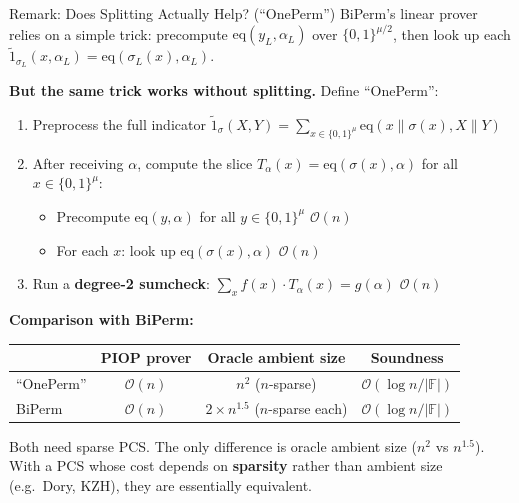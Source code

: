 \documentclass[aspectratio=169,10pt]{beamer}
\newcommand{\F}{\mathbb{F}}
\newcommand{\B}{\{0,1\}}
\newcommand{\eq}{\mathrm{eq}}
\newcommand{\wt}[1]{\widetilde{#1}}
\newcommand{\bigO}{\mathcal{O}}
\begin{document}
\begin{frame}{Remark: Does Splitting Actually Help? (``OnePerm'')}
BiPerm's linear prover relies on a simple trick: precompute $\eq(y_L, \alpha_L)$ over $\B^{\mu/2}$, then look up each $\wt{1}_{\sigma_L}(x, \alpha_L) = \eq(\sigma_L(x), \alpha_L)$.

\vspace{0.4em}
\textbf{But the same trick works without splitting.} Define ``OnePerm'':
\begin{enumerate}
  \item Preprocess the full indicator $\wt{1}_\sigma(X,Y) = \sum_{x \in \B^\mu} \eq(x \| \sigma(x), X \| Y)$
  \item After receiving $\alpha$, compute the slice $T_\alpha(x) = \eq(\sigma(x), \alpha)$ for all $x \in \B^\mu$:
    \begin{itemize}
      \item Precompute $\eq(y, \alpha)$ for all $y \in \B^\mu$ \hfill $\bigO(n)$
      \item For each $x$: look up $\eq(\sigma(x), \alpha)$ \hfill $\bigO(n)$
    \end{itemize}
  \item Run a \textbf{degree-2 sumcheck}: $\sum_{x} f(x) \cdot T_\alpha(x) = g(\alpha)$ \hfill $\bigO(n)$
\end{enumerate}

\vspace{0.3em}
\textbf{Comparison with BiPerm:}\\
\begin{center}
\small
\begin{tabular}{lccc}
\toprule
& PIOP prover & Oracle ambient size & Soundness \\
\midrule
``OnePerm'' & $\bigO(n)$ & $n^2$ ($n$-sparse) & $\bigO(\log n / |\F|)$ \\
BiPerm & $\bigO(n)$ & $2 \times n^{1.5}$ ($n$-sparse each) & $\bigO(\log n / |\F|)$ \\
\bottomrule
\end{tabular}
\end{center}

Both need sparse PCS. The only difference is oracle ambient size ($n^2$ vs $n^{1.5}$). With a PCS whose cost depends on \textbf{sparsity} rather than ambient size (e.g.\ Dory, KZH), they are essentially equivalent.
\end{frame}

\end{document}
